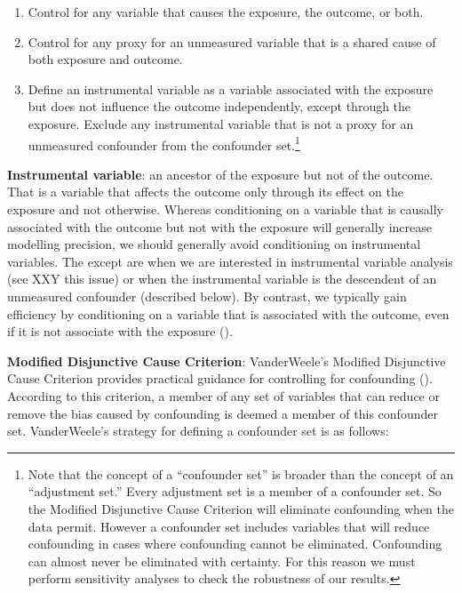 \documentclass[
  singlecolumn,
  9pt]{article}
\providecommand{\tightlist}{%
  \setlength{\itemsep}{0pt}\setlength{\parskip}{0pt}}\usepackage{longtable,booktabs,array}
\begin{document}
\begin{enumerate}
\def\labelenumi{\alph{enumi}.}
\tightlist
\item
  Control for any variable that causes the exposure, the outcome, or
  both.
\item
  Control for any proxy for an unmeasured variable that is a shared
  cause of both exposure and outcome.
\item
  Define an instrumental variable as a variable associated with the
  exposure but does not influence the outcome independently, except
  through the exposure. Exclude any instrumental variable that is not a
  proxy for an unmeasured confounder from the confounder set.\footnote{Note
    that the concept of a ``confounder set'' is broader than the concept
    of an ``adjustment set.'' Every adjustment set is a member of a
    confounder set. So the Modified Disjunctive Cause Criterion will
    eliminate confounding when the data permit. However a confounder set
    includes variables that will reduce confounding in cases where
    confounding cannot be eliminated. Confounding can almost never be
    eliminated with certainty. For this reason we must perform
    sensitivity analyses to check the robustness of our results.}
\end{enumerate}

\textbf{Instrumental variable}: an ancestor of the exposure but not of
the outcome. That is a variable that affects the outcome only through
its effect on the exposure and not otherwise. Whereas conditioning on a
variable that is causally associated with the outcome but not with the
exposure will generally increase modelling precision, we should
generally avoid conditioning on instrumental variables. The except are
when we are interested in instrumental variable analysis (see XXY this
issue) or when the instrumental variable is the descendent of an
unmeasured confounder (described below). By contrast, we typically gain
efficiency by conditioning on a variable that is associated with the
outcome, even if it is not associate with the exposure
().

\textbf{Modified Disjunctive Cause Criterion}: VanderWeele's Modified
Disjunctive Cause Criterion provides practical guidance for controlling
for confounding ().
According to this criterion, a member of any set of variables that can
reduce or remove the bias caused by confounding is deemed a member of
this confounder set. VanderWeele's strategy for defining a confounder
set is as follows:
\end{document}

